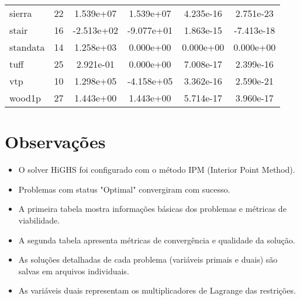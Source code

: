 \documentclass[12pt]{article}
\begin{document}
\begin{longtable}{@{}l|ccccc@{}}
sierra & 22 & 1.539e+07 & 1.539e+07 & 4.235e-16 & 2.751e-23 \\
stair & 16 & -2.513e+02 & -9.077e+01 & 1.863e-15 & -7.413e-18 \\
standata & 14 & 1.258e+03 & 0.000e+00 & 0.000e+00 & 0.000e+00 \\
tuff & 25 & 2.921e-01 & 0.000e+00 & 7.008e-17 & 2.399e-16 \\
vtp & 10 & 1.298e+05 & -4.158e+05 & 3.362e-16 & 2.590e-21 \\
wood1p & 27 & 1.443e+00 & 1.443e+00 & 5.714e-17 & 3.960e-17 \\

\bottomrule
\end{longtable}

\section{Observações}

\begin{itemize}
\item O solver HiGHS foi configurado com o método IPM (Interior Point Method).
\item Problemas com status "Optimal" convergiram com sucesso.
\item A primeira tabela mostra informações básicas dos problemas e métricas de viabilidade.
\item A segunda tabela apresenta métricas de convergência e qualidade da solução.
\item As soluções detalhadas de cada problema (variáveis primais e duais) são salvas em arquivos individuais.
\item As variáveis duais representam os multiplicadores de Lagrange das restrições.
\end{itemize}
\end{document}
